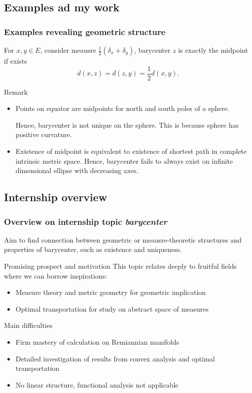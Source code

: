 \documentclass[aspectratio=169]{beamer}
\begin{document}
\subsection{Examples ad my work}
\begin{frame}
	\frametitle{Examples revealing geometric structure}
	\begin{example}
		For $x,y \in E$, consider meausre $\frac{1}{2}(\delta_x + \delta_y)$, barycenter $z$ is exactly the midpoint if exists
		\[
			d(x, z) = d(z, y) = \frac{1}{2} d(x,y).
		\]
	\end{example}
	\pause
	\begin{block}{Remark}
		\begin{itemize}
			\item Points on equator are midpoints for north and south poles of a sphere.

			      Hence, barycenter is not unique on the sphere. This is because sphere has positive curvature.
			      \pause
			\item Existence of midpoint is equivalent to existence of shortest path in complete intrinsic metric space.
			      Hence, barycenter fails to always exist on infinite dimensional ellipse with decreasing axes.
		\end{itemize}
	\end{block}
\end{frame}

\subsection{Internship overview}
\begin{frame}
	\frametitle{Overview on internship topic \textit{barycenter}}
	Aim to find connection between geometric or meausre-theoretic structures and properties of barycenter, such as existence and uniqueness.
	\pause
	\begin{block}{Promising prospect and motivation}
		This topic relates deeply to fruitful fields where we can borrow inspirations:
		\begin{itemize}
			\item Measure theory and metric geometry for geometric implication
			      \pause
			\item Optimal transportation for study on abstract space of measures
		\end{itemize}
	\end{block}
	\pause
	\begin{block}{Main difficulties}
		\begin{itemize}
			\item Firm mastery of calculation on Remiannian manifolds
			      \pause
			\item Detailed investigation of results from convex analysis and optimal transportation
			      \pause
			\item No linear structure, functional analysis not applicable
		\end{itemize}
	\end{block}
\end{frame}
\end{document}
